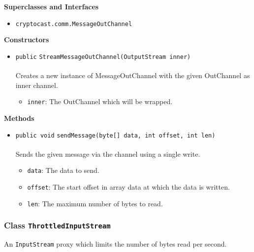 \textbf{\sffamily Superclasses and Interfaces}
\begin{itemize}
\item \lstinline|cryptocast.comm.MessageOutChannel|
\end{itemize}


\textbf{\sffamily Constructors}
\begin{itemize}
\item \lstinline|public| \lstinline|StreamMessageOutChannel|\lstinline|(OutputStream inner)|\\ \\[-0.6em]
Creates a new instance of MessageOutChannel with the given OutChannel as inner channel.
\begin{itemize}
\item \lstinline|inner|: The OutChannel which will be wrapped.
\end{itemize}



\end{itemize}


\textbf{\sffamily Methods}
\begin{itemize}
\item \lstinline|public void| \lstinline|sendMessage|\lstinline|(byte[] data, int offset, int len)|\\ \\[-0.6em]
Sends the given message via the channel using a single write.
\begin{itemize}
\item \lstinline|data|: The data to send.
\item \lstinline|offset|: The start offset in array data at which the data is written.
\item \lstinline|len|: The maximum number of bytes to read.
\end{itemize}



\end{itemize}

\subsubsection{Class \lstinline|ThrottledInputStream|}
An \lstinline|InputStream| proxy which limits the number of bytes read per second. \\
\noindent\begin{minipage}[t]{5cm}
\vspace{0.3em}
\hspace*{2em}
\vspace{0.3em}
\end{minipage}




